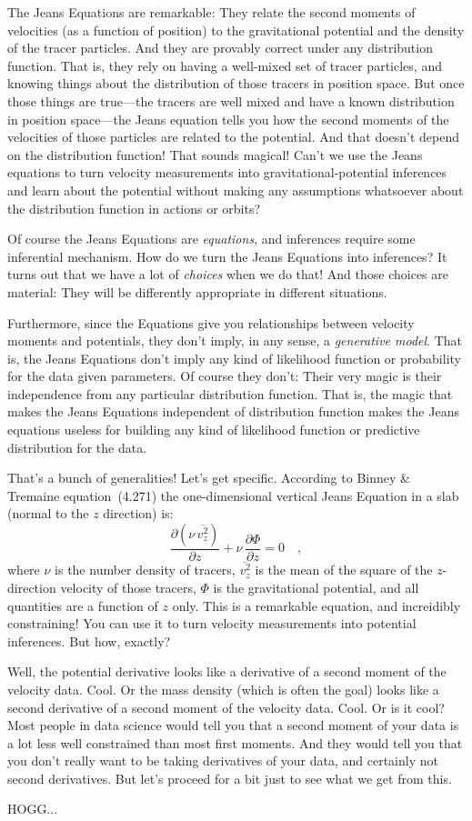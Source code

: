 \documentclass[12pt,letterpaper]{article}
\newcommand{\equationname}{equation}
\begin{document}
The Jeans Equations are remarkable: They relate the second moments of
velocities (as a function of position) to the gravitational potential
and the density of the tracer particles.
And they are provably correct under any distribution function.
That is, they rely on having a well-mixed set of tracer particles,
and knowing things about the distribution of those tracers in position space.
But once those things are true---the tracers are well mixed and have a known
distribution in position space---the Jeans equation tells you how the second
moments of the velocities of those particles are related to the potential.
And that doesn't depend on the distribution function!
That sounds magical!
Can't we use the Jeans equations to turn velocity measurements into
gravitational-potential inferences and learn about the potential without
making any assumptions whatsoever about the distribution function in
actions or orbits?

Of course the Jeans Equations are \emph{equations}, and inferences require
some inferential mechanism.
How do we turn the Jeans Equations into inferences?
It turns out that we have a lot of \emph{choices} when we do that!
And those choices are material: They will be differently appropriate in
different situations.

Furthermore, since the Equations give you relationships between velocity moments
and potentials, they don't imply, in any sense, a \emph{generative model}.
That is, the Jeans Equations don't imply any kind of likelihood function or
probability for the data given parameters.
Of course they don't: Their very magic is their independence from any particular
distribution function.
That is, the magic that makes the Jeans Equations independent of distribution
function makes the Jeans equations useless for building any kind of likelihood
function or predictive distribution for the data.

That's a bunch of generalities! Let's get specific.
According to Binney \& Tremaine \equationname~(4.271) the one-dimensional vertical
Jeans Equation in a slab (normal to the $z$ direction) is:
\begin{equation}
\frac{\partial(\nu\,\overline{v_z^2})}{\partial z} + \nu\,\frac{\partial\Phi}{\partial z} = 0
\quad ,
\end{equation}
where
$\nu$ is the number density of tracers,
$\overline{v_z^2}$ is the mean of the square of the $z$-direction velocity of those tracers,
$\Phi$ is the gravitational potential,
and all quantities are a function of $z$ only.
This is a remarkable equation, and increidibly constraining!
You can use it to turn velocity measurements into potential inferences.
But how, exactly?

Well, the potential derivative looks like a derivative of a second
moment of the velocity data.
Cool.
Or the mass density (which is often the goal) looks like a second
derivative of a second moment of the velocity data.
Cool.
Or is it cool?
Most people in data science would tell you that a second moment of
your data is a lot less well constrained than most first moments.
And they would tell you that you don't really want to be taking
derivatives of your data, and certainly not second derivatives.
But let's proceed for a bit just to see what we get from this.

HOGG...
\end{document}
